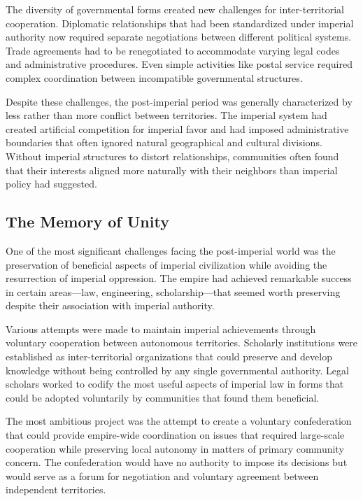 The diversity of governmental forms created new challenges for
inter-territorial cooperation. Diplomatic relationships that had been
standardized under imperial authority now required separate negotiations
between different political systems. Trade agreements had to be
renegotiated to accommodate varying legal codes and administrative
procedures. Even simple activities like postal service required complex
coordination between incompatible governmental structures.

Despite these challenges, the post-imperial period was generally
characterized by less rather than more conflict between territories. The
imperial system had created artificial competition for imperial favor
and had imposed administrative boundaries that often ignored natural
geographical and cultural divisions. Without imperial structures to
distort relationships, communities often found that their interests
aligned more naturally with their neighbors\textquotesingle{} than
imperial policy had suggested.

\subsection{The Memory of Unity}\label{the-memory-of-unity}

One of the most significant challenges facing the post-imperial world
was the preservation of beneficial aspects of imperial civilization
while avoiding the resurrection of imperial oppression. The empire had
achieved remarkable success in certain areas---law, engineering,
scholarship---that seemed worth preserving despite their association
with imperial authority.

Various attempts were made to maintain imperial achievements through
voluntary cooperation between autonomous territories. Scholarly
institutions were established as inter-territorial organizations that
could preserve and develop knowledge without being controlled by any
single governmental authority. Legal scholars worked to codify the most
useful aspects of imperial law in forms that could be adopted
voluntarily by communities that found them beneficial.

The most ambitious project was the attempt to create a voluntary
confederation that could provide empire-wide coordination on issues that
required large-scale cooperation while preserving local autonomy in
matters of primary community concern. The confederation would have no
authority to impose its decisions but would serve as a forum for
negotiation and voluntary agreement between independent territories.


